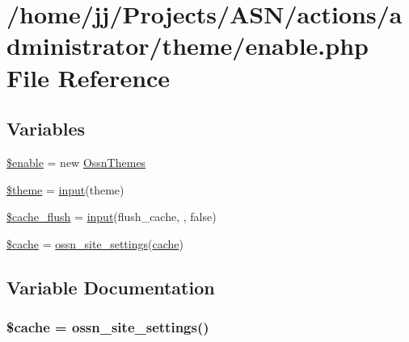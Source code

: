 \hypertarget{theme_2enable_8php}{}\section{/home/jj/\+Projects/\+A\+S\+N/actions/administrator/theme/enable.php File Reference}
\label{theme_2enable_8php}
\subsection*{Variables}
\begin{DoxyCompactItemize}
\item 
\hyperlink{theme_2enable_8php_abea865f3ca62b18578d7a0ca285d216e}{\$enable} = new \hyperlink{class_ossn_themes}{Ossn\+Themes}
\item 
\hyperlink{theme_2enable_8php_a1ae541f7fe1c5e21cb4535f88ec9e9dc}{\$theme} = \hyperlink{ossn_8lib_8input_8php_a64ebee98b041c4f75f71ed3cd73cc8ed}{input}(\textquotesingle{}theme\textquotesingle{})
\item 
\hyperlink{theme_2enable_8php_a151b5f3a9fe388b3ab2ae8d39857e089}{\$cache\+\_\+flush} = \hyperlink{ossn_8lib_8input_8php_a64ebee98b041c4f75f71ed3cd73cc8ed}{input}(\textquotesingle{}flush\+\_\+cache\textquotesingle{}, \textquotesingle{}\textquotesingle{}, false)
\item 
\hyperlink{theme_2enable_8php_ac2dc76d756ec398393d4b1d23659276c}{\$cache} = \hyperlink{ossn_8lib_8system_8php_a610e2045b8a86c09f777b4d82e24e34c}{ossn\+\_\+site\+\_\+settings}(\textquotesingle{}\hyperlink{jquery_8tokeninput_8js_a521016aa0ca9ff38bfba60ab069cb34b}{cache}\textquotesingle{})
\end{DoxyCompactItemize}


\subsection{Variable Documentation}
\subsubsection[{\texorpdfstring{\$cache}{$cache}}]{\setlength{\rightskip}{0pt plus 5cm}\${\bf cache} = {\bf ossn\+\_\+site\+\_\+settings}(\textquotesingle{})}\hypertarget{theme_2enable_8php_ac2dc76d756ec398393d4b1d23659276c}{}\label{theme_2enable_8php_ac2dc76d756ec398393d4b1d23659276c}



